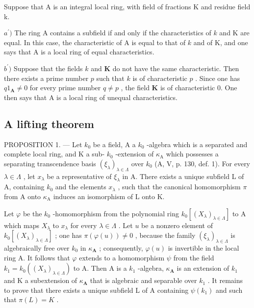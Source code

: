 Suppose that A is an integral local ring, with field of fractions K and residue field k.

\(a^{\prime})\) The ring A contains a subfield if and only if the characteristics of \(k\) and K are equal. In this case, the characteristic of A is equal to that of \(k\) and of K, and one says that A is a local ring of equal characteristics.

\(b^{\prime})\) Suppose that the fields \(k\) and \(\mathbf{K}\) do not have the same characteristic. Then there exists a prime number \(p\) such that \(k\) is of characteristic \(p\) . Since one has \(q1_{\mathbf{A}} \neq 0\) for every prime number \(q \neq p\) , the field \(\mathbf{K}\) is of characteristic 0. One then says that A is a local ring of unequal characteristics.

\subsection{A lifting theorem}

PROPOSITION 1. --- Let \(k_{0}\) be a field, A a \(k_{0}\) -algebra which is a separated and complete local ring, and K a sub- \(k_{0}\) -extension of \(\kappa_{\mathrm{A}}\) which possesses a separating transcendence basis \((\xi_{\lambda})_{\lambda \in \Lambda}\) over \(k_{0}\) (A, V, p. 130, def. 1). For every \(\lambda \in \Lambda\) , let \(x_{\lambda}\) be a representative of \(\xi_{\lambda}\) in A. There exists a unique subfield L of A, containing \(k_{0}\) and the elements \(x_{\lambda}\) , such that the canonical homomorphism \(\pi\) from A onto \(\kappa_{\mathrm{A}}\) induces an isomorphism of L onto K.

Let \(\varphi\) be the \(k_{0}\) -homomorphism from the polynomial ring \(k_{0}[(X_{\lambda})_{\lambda \in \Lambda}]\) to A which maps \(X_{\lambda}\) to \(x_{\lambda}\) for every \(\lambda \in \Lambda\) . Let \(u\) be a nonzero element of \(k_{0}[(X_{\lambda})_{\lambda \in \Lambda}]\) ; one has \(\pi (\varphi (u)) \neq 0\) , because the family \((\xi_{\lambda})_{\lambda \in \Lambda}\) is algebraically free over \(k_{0}\) in \(\kappa_{\mathbf{A}}\) ; consequently, \(\varphi (u)\) is invertible in the local ring A. It follows that \(\varphi\) extends to a homomorphism \(\psi\) from the field \(k_{1} = k_{0}((X_{\lambda})_{\lambda \in \Lambda})\) to A. Then A is a \(k_{1}\) -algebra, \(\kappa_{\mathbf{A}}\) is an extension of \(k_{1}\) and K a subextension of \(\kappa_{\mathbf{A}}\) that is algebraic and separable over \(k_{1}\) . It remains to prove that there exists a unique subfield L of A containing \(\psi(k_{1})\) and such that \(\pi(L) = K\) .

